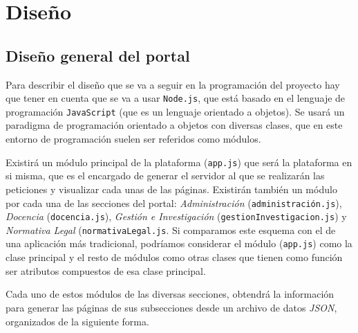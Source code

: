 \chapter{Diseño}

\section{Diseño general del portal}

Para describir el diseño que se va a seguir en la programación del proyecto hay que tener en cuenta que se va a usar {\tt Node.js}, que está basado en el lenguaje de programación {\tt JavaScript} (que es un lenguaje orientado a objetos). Se usará un paradigma de programación orientado a objetos con diversas clases, que en este entorno de programación suelen ser referidos como módulos.

\bigskip
Existirá un módulo principal de la plataforma ({\tt app.js}) que será la plataforma en si misma, que es el encargado de generar el servidor al que se realizarán las peticiones y visualizar cada unas de las páginas. Existirán también un módulo por cada una de las secciones del portal: \textit{Administración} ({\tt administración.js}), \textit{Docencia} ({\tt docencia.js}), \textit{Gestión e Investigación} ({\tt gestionInvestigacion.js}) y \textit{Normativa Legal} ({\tt normativaLegal.js}. Si comparamos este esquema con el de una aplicación más tradicional, podríamos considerar el módulo ({\tt app.js}) como la clase principal y el resto de módulos como otras clases que tienen como función ser atributos compuestos de esa clase principal.

\bigskip
Cada uno de estos módulos de las diversas secciones, obtendrá la información para generar las páginas de sus subsecciones desde un archivo de datos \textit{JSON}, organizados de la siguiente forma.

